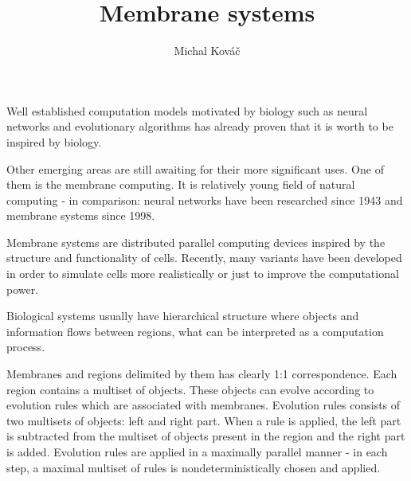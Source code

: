 \documentclass{svk_short_en}
\begin{document}
\title{Membrane systems}

\author{Michal Kováč
}




\maketitle

Well established computation models motivated by biology such as neural networks and evolutionary algorithms has already proven that it is worth to be inspired by biology.

Other emerging areas are still awaiting for their more significant uses. One of them is the membrane computing. It is relatively young field of natural computing - in comparison: neural networks have been researched since 1943 and membrane systems since 1998. \cite{Paun98}

Membrane systems are distributed parallel computing devices inspired by the structure and functionality of cells. Recently, many variants have been developed in order to simulate cells more realistically or just to improve the computational power.


Biological systems usually have hierarchical structure where objects and information flows between regions, what can be interpreted as a computation process.

Membranes and regions delimited by them has clearly 1:1 correspondence. Each region contains a multiset of objects. These objects can evolve according to evolution rules which are associated with membranes. Evolution rules consists of two multisets of objects: left and right part. When a rule is applied, the left part is subtracted from the multiset of objects present in the region and the right part is added. Evolution rules are applied in a maximally parallel manner - in each step, a maximal multiset of rules is nondeterministically chosen and applied.
\end{document}
